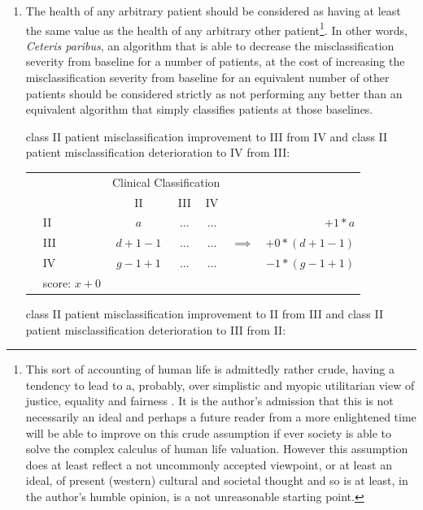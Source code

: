\documentclass[]{article}
\newcommand\tab[1][1cm]{\hspace*{#1}} %
\begin{document}
\begin{enumerate}
	\item The health of any arbitrary patient should be considered as having at least the same value as the health of any arbitrary other patient\footnote{This sort of accounting of human life is admittedly rather crude, having a tendency to lead to a, probably, over simplistic and myopic utilitarian view of justice, equality and fairness \cite{Sandel2010}. It is the author's admission that this is not necessarily an ideal and perhaps a future reader from a more enlightened time will be able to improve on this crude assumption if ever society is able to solve the complex calculus of human life valuation. However this assumption does at least reflect a not uncommonly accepted viewpoint, or at least an ideal, of present (western) cultural and societal thought and so is at least, in the author's humble opinion, is a not unreasonable starting point.}. In other words, \textit{Ceteris paribus}, an algorithm that is able to decrease the misclassification severity from baseline for a number of patients, at the cost of increasing the misclassification severity from baseline for an equivalent number of other patients should be considered strictly as not performing any better than an equivalent algorithm that simply classifies patients at those baselines.
	
	\tab class II patient misclassification improvement to III from IV and	\tab class II patient misclassification deterioration to IV from III:
	
	\begin{center}
		\begin{tabular}{l|l|c|c|c|cr}
			\multicolumn{2}{c}{}&\multicolumn{3}{c}{Clinical Classification}&&\\
			\cline{3-5}
			\multicolumn{2}{c|}{}&II&III&IV&&\\
			\cline{2-5}
			\multirow{5}{0.8cm}{\rotatebox{90}{\parbox{0.8cm}{\centering Algorithm \\ Classification}}} %
			& II & $a$ & $...$ & $...$ & & $+1*a$\\
			\cline{2-5}
			& III & $d+1-1$ & $...$ & $...$ & $\implies$ & $+0*(d+1-1)$\\
			\cline{2-5}
			& IV & $g-1+1$ & $...$ & $...$ & & \underline{$-1*(g-1+1)$}\\
			\cline{2-5}
			\multicolumn{6}{c}{} & score: $x+0$
		\end{tabular}
	\end{center}
	
	\tab class II patient misclassification improvement to II from III  and \tab class II patient misclassification deterioration to III from II:
	

\end{enumerate}
\end{document}
